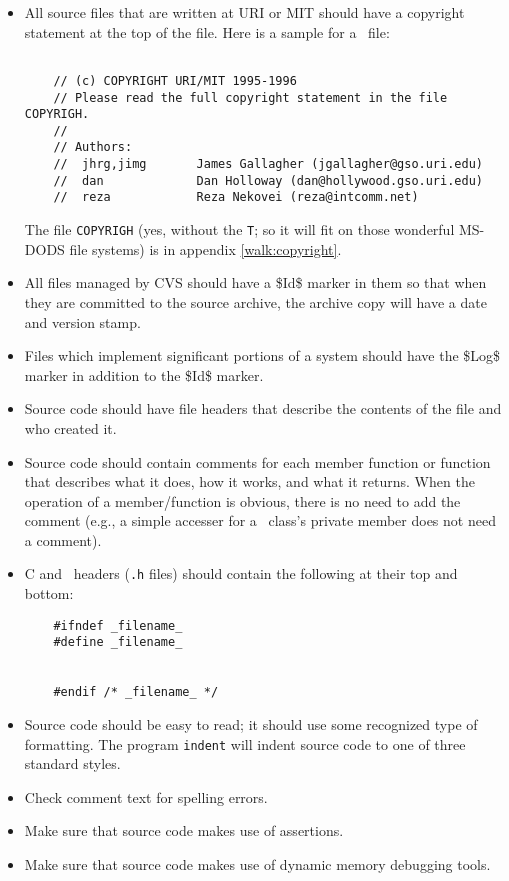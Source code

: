 \begin{itemize}

\item All source files that are written at URI or MIT should have a copyright
  statement at the top of the file. Here is a sample for a \Cpp\ file:
\begin{verbatim}

    // (c) COPYRIGHT URI/MIT 1995-1996
    // Please read the full copyright statement in the file COPYRIGH.  
    //
    // Authors:
    //  jhrg,jimg       James Gallagher (jgallagher@gso.uri.edu)
    //  dan             Dan Holloway (dan@hollywood.gso.uri.edu)
    //  reza            Reza Nekovei (reza@intcomm.net)

\end{verbatim}
\noindent The file {\tt COPYRIGH} (yes, without the {\tt T}; so it will fit
    on those wonderful MS-DODS file systems) is in appendix 
    \ref{walk:copyright}.

\item All files managed by CVS should have a \$Id\$ marker in them so that
  when they are committed to the source archive, the archive copy will have a
  date and version stamp.

\item Files which implement significant portions of a system should have the
  \$Log\$ marker in addition to the \$Id\$ marker.

\item Source code should have file headers that describe the contents
  of the file and who created it.

\item Source code should contain comments for each member function or
  function that describes what it does, how it works, and what it
  returns. When the operation of a member/function is obvious, there is no
  need to add the comment (e.g., a simple accesser for a \Cpp\ class's
  private member does not need a comment).

\item C and \Cpp\ headers ({\tt *.h} files) should contain the following at
  their top and bottom:
  \begin{verbatim}
    #ifndef _filename_
    #define _filename_


    #endif /* _filename_ */
\end{verbatim}

\item Source code should be easy to read; it should use some recognized type
  of formatting. The program {\tt indent} will indent source code to one of
  three standard styles. 

\item Check comment text for spelling errors.

\item Make sure that source code makes use of assertions.

\item Make sure that source code makes use of dynamic memory debugging tools.

\end{itemize}

